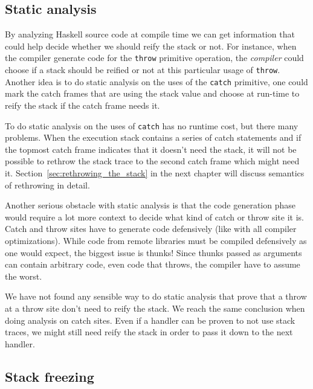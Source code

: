 \subsection{Static analysis} \label{reify_static_analysis}

By analyzing Haskell source code at compile time we can get
information that could help decide whether we should reify the stack or
not. For instance, when the compiler generate code for the \texttt{throw}
primitive operation, the \emph{compiler} could choose if a stack should be reified or
not at this particular usage of \texttt{throw}. Another idea is to do
static analysis on the uses of the \texttt{catch} primitive, one could mark
the catch frames that are using the stack value and choose at
run-time to reify the stack if the catch frame needs it.

To do static analysis on the uses of \texttt{catch} has no runtime cost, but
there many problems. When the execution stack contains a series of catch
statements and if the topmost catch frame indicates that it doesn't need the stack,
it will not be possible to rethrow the stack trace to the second catch frame which
might need it. Section~\ref{sec:rethrowing_the_stack} in the next chapter
will discuss semantics of rethrowing in detail.

Another serious obstacle with static analysis is that the code
generation phase would require a lot more context to decide what kind
of catch or throw site it is. Catch and throw sites have to generate
code defensively (like with all compiler optimizations). While code from
remote libraries must be compiled defensively as one would expect, the
biggest issue is thunks! Since thunks passed as arguments can contain
arbitrary code, even code that throws, the compiler have to assume the
worst.

We have not found any sensible way to do static analysis that prove that
a throw at a throw site don't need to reify the stack. We reach the same
conclusion when doing analysis on catch sites. Even if a handler can be
proven to not use stack traces, we might still need reify the stack in
order to pass it down to the next handler.

\subsection{Stack freezing} \label{sec:stack_freezing}

